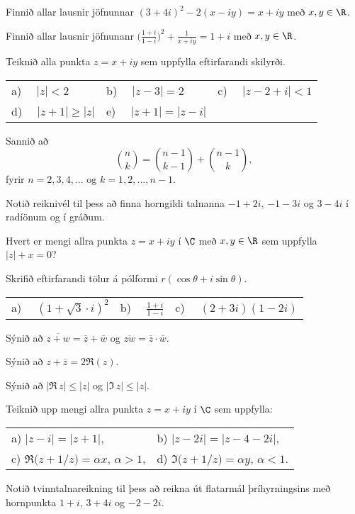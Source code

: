 \vfill\eject

\aefing

\daemi Finnið allar lausnir jöfnunnar $(3+4i)^2 - 2(x-iy) = x+iy$
með $x,y\in \R$.

\daemi Finnið allar lausnir jöfnunanr 
$\big(\frac{1+i}{1-i}\big)^2 + \frac{1}{x+iy} = 1+i$
með $x,y\in \R$.

\daemi Teiknið alla punkta $z=x+iy$ sem uppfylla eftirfarandi skilyrði.


\begin{tabular}{lll}
a) \ \  $|z|<2$ & b) \ \ $|z-3|=2$ &c) \ \  $|z-2+i|<1$ \\
d) \ \  $|z+1|\geq |z|$ & e) \ \  $|z+1| = |z-i|$
\end{tabular}

\daemi Sannið að 
$$
\binom nk=\binom{n-1}{k-1}+\binom{n-1}k, 
$$
fyrir $n=2,3,4,\dots$ og $k=1,2,\dots,n-1$.


\daemi Notið reiknivél til þess að finna horngildi talnanna
$-1+2i$, $-1-3i$ og  $3-4i$ í radíönum og í gráðum.

\daemi Hvert er mengi allra punkta $z=x+iy$ í $\C$ með $x,y\in \R$
sem uppfylla $|z|+x=0$?


\daemi Skrifið eftirfarandi tölur á pólformi $r(\cos \theta+i\sin
\theta)$. 

\smallskip
\begin{tabular}{lll}
a) \ \  $(1+\sqrt{3}\cdot i)^2$ &
b) \ \  $\frac{1+i}{1-i}$ &
c) \ \ $(2+3i)(1-2i)$ \\
\end{tabular}

\daemi Sýnið að $\overline {z+w}=\bar z+\bar w$ og
$\overline{zw}=\bar z\cdot \bar w$.

\daemi Sýnið að $z + \overline z = 2\Re(z)$.

\daemi Sýnið að $|\Re\, z|\leq|z|$ og $|\Im\, z|\leq|z|$.

\daemi Teiknið upp mengi allra punkta $z=x+iy$ í $\C$ sem uppfylla:

\smallskip
\begin{tabular}{ll}
a)  $|z-i|=|z+1|$,
&b) $|z-2i|=|z-4-2i|$,\\
c) $\Re\big(z+1/z\big)={\alpha}x$, ${\alpha}>1$,
&d) $\Im\big(z+1/z\big)={\alpha} y$, ${\alpha}<1$.\\ 
\end{tabular}

\daemi Notið tvinntalnareikning til þess að reikna út flatarmál 
þríhyrningsins með hornpunkta $1+i$, $3+4i$ og $-2-2i$.

